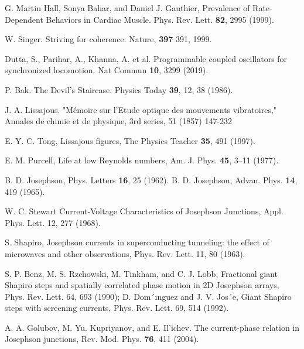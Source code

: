 \documentclass[twocolumn,preprintnumbers,amsmath,amssymb,aps,prx]{revtex4}
\begin{document}
\begin{thebibliography}{99}
   G. Martin Hall, Sonya Bahar, and Daniel J. Gauthier, Prevalence of Rate-Dependent Behaviors in Cardiac Muscle. Phys. Rev. Lett. {\bf 82}, 2995 (1999).

   W. Singer. Striving for coherence. Nature, {\bf 397} 391, 1999.

     Dutta, S., Parihar, A., Khanna, A. et al. Programmable coupled oscillators for synchronized locomotion. Nat Commun {\bf 10}, 3299 (2019).
    
     P. Bak. The Devil's Staircase. Physics Today {\bf 39}, 12, 38 (1986).

     J. A. Lissajous.  "Mémoire sur l'Etude optique des mouvements vibratoires,"  Annales de chimie et de physique, 3rd series, 51 (1857) 147-232

     E. Y. C. Tong, Lissajous figures, The Physics Teacher {\bf 35}, 491 (1997).

     E. M. Purcell, Life at low Reynolds numbers, Am. J. Phys. {\bf 45}, 3–11 (1977).


     B. D. Josephson, Phys. Letters {\bf 16}, 25 (1962). 
     B. D. Josephson, Advan. Phys. {\bf 14}, 419 (1965).

      W. C. Stewart Current‐Voltage Characteristics of Josephson Junctions, Appl. Phys. Lett. 12, 277 (1968).
      
     S. Shapiro, Josephson currents in superconducting tunneling: the effect of microwaves and other observations, Phys. Rev. Lett. 11, 80 (1963).

      S. P. Benz, M. S. Rzchowski, M. Tinkham, and C. J. Lobb, Fractional giant Shapiro steps and spatially correlated phase motion in 2D Josephson arrays, Phys. Rev. Lett. 64, 693 (1990); D. Dom´ınguez and J. V. Jos´e, Giant Shapiro steps with screening currents, Phys. Rev. Lett. 69,
514 (1992).

     A. A. Golubov, M. Yu. Kupriyanov, and E. Il’ichev. The current-phase relation in Josephson junctions, Rev. Mod. Phys. {\bf 76}, 411 (2004).


\end{thebibliography}
\end{document}
